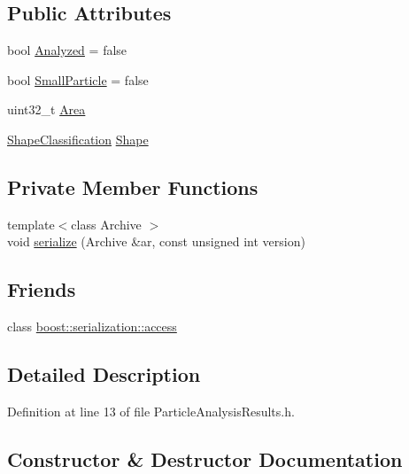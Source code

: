 \subsection*{Public Attributes}
\begin{DoxyCompactItemize}
\item 
bool \hyperlink{class_soil_analyzer_1_1_particle_analysis_results_abfb8465c0cfbe9a6ad4d844f6269676f}{Analyzed} = false
\item 
bool \hyperlink{class_soil_analyzer_1_1_particle_analysis_results_a8aaa7f053d68bce6f1ad2b7bcd30cd95}{Small\+Particle} = false
\item 
uint32\+\_\+t \hyperlink{class_soil_analyzer_1_1_particle_analysis_results_a1a6dbe8880b29f51ba3d8ec28b96ed45}{Area}
\item 
\hyperlink{class_shape_classification}{Shape\+Classification} \hyperlink{class_soil_analyzer_1_1_particle_analysis_results_a75230aa0675b2df489c08bcfffb43b97}{Shape}
\end{DoxyCompactItemize}
\subsection*{Private Member Functions}
\begin{DoxyCompactItemize}
\item 
{\footnotesize template$<$class Archive $>$ }\\void \hyperlink{class_soil_analyzer_1_1_particle_analysis_results_a89c11362f5cb934006c6d67d1b51eef4}{serialize} (Archive \&ar, const unsigned int version)
\end{DoxyCompactItemize}
\subsection*{Friends}
\begin{DoxyCompactItemize}
\item 
class \hyperlink{class_soil_analyzer_1_1_particle_analysis_results_ac98d07dd8f7b70e16ccb9a01abf56b9c}{boost\+::serialization\+::access}
\end{DoxyCompactItemize}


\subsection{Detailed Description}


Definition at line 13 of file Particle\+Analysis\+Results.\+h.



\subsection{Constructor \& Destructor Documentation}
\hypertarget{class_soil_analyzer_1_1_particle_analysis_results_a5107ea5aae70deadb77ab22c2429f7f6}{}
